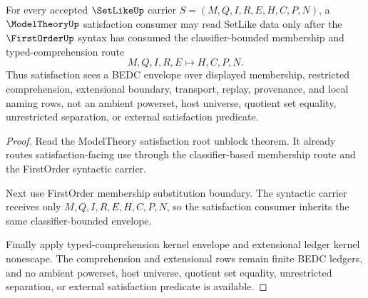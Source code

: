 \begin{theorem}
\label{thm:setlike-modeltheory-satisfaction-envelope}
For every accepted $\SetLikeUp$ carrier $S=(M,Q,I,R,E,H,C,P,N)$, a $\ModelTheoryUp$ satisfaction consumer may read SetLike data only after the $\FirstOrderUp$ syntax has consumed the classifier-bounded membership and typed-comprehension route
$$
M,Q,I,R,E \longmapsto H,C,P,N .
$$
Thus satisfaction sees a BEDC envelope over displayed membership, restricted comprehension, extensional boundary, transport, replay, provenance, and local naming rows, not an ambient powerset, host universe, quotient set equality, unrestricted separation, or external satisfaction predicate.
\end{theorem}
\begin{proof}
Read the ModelTheory satisfaction root unblock theorem. It already routes satisfaction-facing use through the classifier-based membership route and the FirstOrder syntactic carrier.

Next use FirstOrder membership substitution boundary. The syntactic carrier receives only $M,Q,I,R,E,H,C,P,N$, so the satisfaction consumer inherits the same classifier-bounded envelope.

Finally apply typed-comprehension kernel envelope and extensional ledger kernel nonescape. The comprehension and extensional rows remain finite BEDC ledgers, and no ambient powerset, host universe, quotient set equality, unrestricted separation, or external satisfaction predicate is available.
\end{proof}

